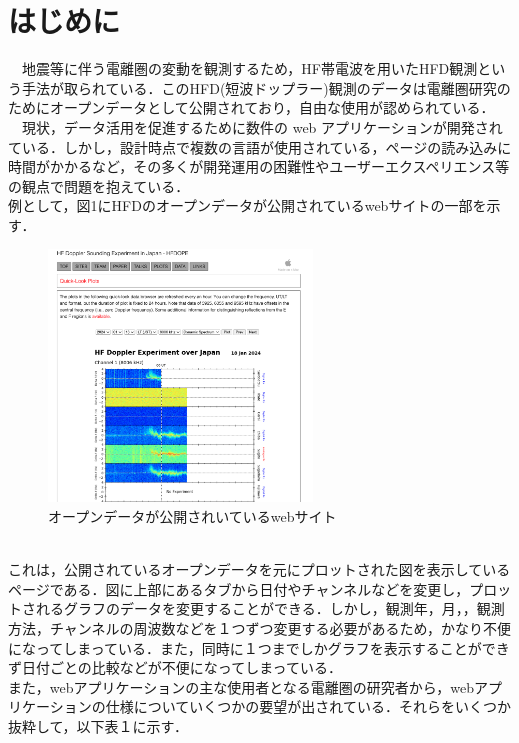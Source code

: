 \section{はじめに}

　地震等に伴う電離圏の変動を観測するため，HF帯電波を用いたHFD観測という手法が取られている．このHFD(短波ドップラー)観測のデータは電離圏研究のためにオープンデータとして公開されており，自由な使用が認められている．\cite{hfd_report}\\
　現状，データ活用を促進するために数件の web アプリケーションが開発されている．しかし，設計時点で複数の言語が使用されている，ページの読み込みに時間がかかるなど，その多くが開発運用の困難性やユーザーエクスペリエンス等の観点で問題を抱えている．\\
 例として，図1にHFDのオープンデータが公開されているwebサイトの一部を示す．\cite{hfd_link}\\
 \begin{figure}[h]
   \centering
   \includegraphics[width=70mm]{fig/websc.png}
   \caption{オープンデータが公開されいているwebサイト}
 \end{figure}\\
 これは，公開されているオープンデータを元にプロットされた図を表示しているページである．図に上部にあるタブから日付やチャンネルなどを変更し，プロットされるグラフのデータを変更することができる．しかし，観測年，月，，観測方法，チャンネルの周波数などを１つずつ変更する必要があるため，かなり不便になってしまっている．また，同時に１つまでしかグラフを表示することができず日付ごとの比較などが不便になってしまっている．\\
また，webアプリケーションの主な使用者となる電離圏の研究者から，webアプリケーションの仕様についていくつかの要望が出されている．それらをいくつか抜粋して，以下表１に示す．\\
